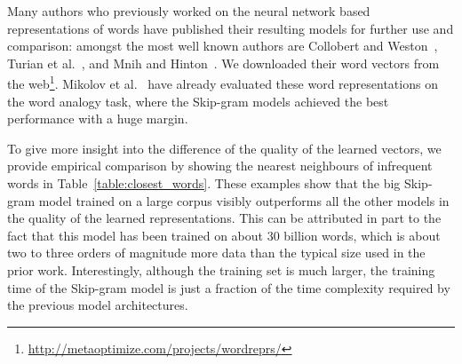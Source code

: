 \documentclass{article}
\begin{document}
Many authors who previously worked on the neural network based representations of words have published their resulting
models for further use and comparison: amongst the most well known authors
are Collobert and Weston~\cite{collobert}, Turian et al.~\cite{turian},
and Mnih and Hinton~\cite{mnih}. We downloaded their word vectors from
the web\footnote{\url{http://metaoptimize.com/projects/wordreprs/}}. %
Mikolov et al.~\cite{mikolov} have already evaluated these word representations on the word analogy task,
where the Skip-gram models achieved the best performance with a huge margin.

To give more insight into the difference of the quality of the learned
vectors, we provide empirical comparison by showing the nearest neighbours of infrequent
words in Table~\ref{table:closest_words}. These examples show that the big Skip-gram model trained on a large
corpus visibly outperforms all the other models in the quality of the learned representations.
This can be attributed in part to the fact that this model
has been trained on about 30 billion words, which is about two to three orders of magnitude more data than
the typical size used in the prior work. Interestingly, although the training set is much larger,
the training time of the Skip-gram model is just a fraction
of the time complexity required by the previous model architectures.
\end{document}
